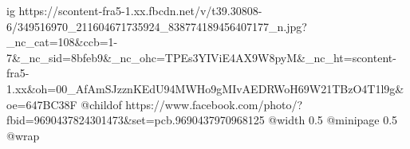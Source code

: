  
 
 
 
 

\ifcmt
  ig https://scontent-fra5-1.xx.fbcdn.net/v/t39.30808-6/349516970_211604671735924_838774189456407177_n.jpg?_nc_cat=108&ccb=1-7&_nc_sid=8bfeb9&_nc_ohc=TPEs3YIViE4AX9W8pyM&_nc_ht=scontent-fra5-1.xx&oh=00_AfAmSJzznKEdU94MWHo9gMIvAEDRWoH69W21TBzO4T1l9g&oe=647BC38F
	@childof https://www.facebook.com/photo/?fbid=9690437824301473&set=pcb.9690437970968125
  @width 0.5
  @minipage 0.5
  @wrap \parpic[l]
\fi
